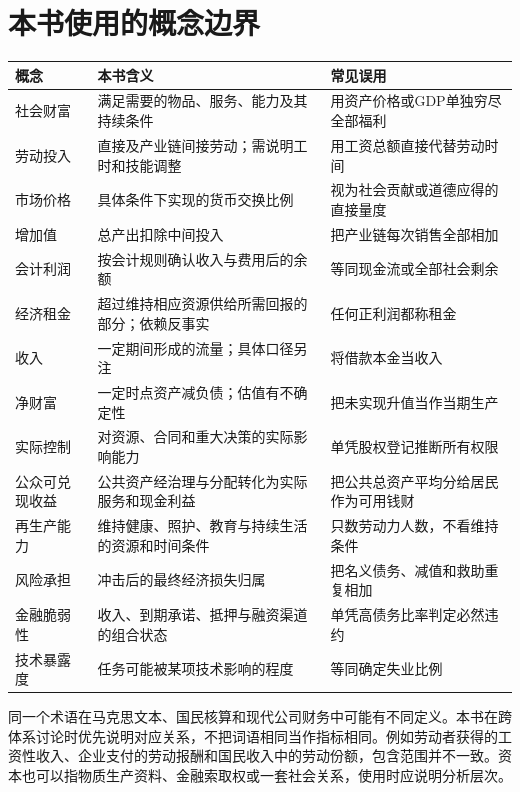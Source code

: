 \documentclass[UTF8,fontset=fandol,zihao=-4,oneside,openany]{ctexbook}
\begin{document}
\section{本书使用的概念边界}
\begin{longtable}{p{29mm}p{57mm}p{57mm}}
\toprule 概念 & 本书含义 & 常见误用\\\midrule\endhead
社会财富 & 满足需要的物品、服务、能力及其持续条件 & 用资产价格或GDP单独穷尽全部福利\\
劳动投入 & 直接及产业链间接劳动；需说明工时和技能调整 & 用工资总额直接代替劳动时间\\
市场价格 & 具体条件下实现的货币交换比例 & 视为社会贡献或道德应得的直接量度\\
增加值 & 总产出扣除中间投入 & 把产业链每次销售全部相加\\
会计利润 & 按会计规则确认收入与费用后的余额 & 等同现金流或全部社会剩余\\
经济租金 & 超过维持相应资源供给所需回报的部分；依赖反事实 & 任何正利润都称租金\\
收入 & 一定期间形成的流量；具体口径另注 & 将借款本金当收入\\
净财富 & 一定时点资产减负债；估值有不确定性 & 把未实现升值当作当期生产\\
实际控制 & 对资源、合同和重大决策的实际影响能力 & 单凭股权登记推断所有权限\\
公众可兑现收益 & 公共资产经治理与分配转化为实际服务和现金利益 & 把公共总资产平均分给居民作为可用钱财\\
再生产能力 & 维持健康、照护、教育与持续生活的资源和时间条件 & 只数劳动力人数，不看维持条件\\
风险承担 & 冲击后的最终经济损失归属 & 把名义债务、减值和救助重复相加\\
金融脆弱性 & 收入、到期承诺、抵押与融资渠道的组合状态 & 单凭高债务比率判定必然违约\\
技术暴露度 & 任务可能被某项技术影响的程度 & 等同确定失业比例\\
\bottomrule
\end{longtable}

同一个术语在马克思文本、国民核算和现代公司财务中可能有不同定义。本书在跨体系讨论时优先说明对应关系，不把词语相同当作指标相同。例如劳动者获得的工资性收入、企业支付的劳动报酬和国民收入中的劳动份额，包含范围并不一致。资本也可以指物质生产资料、金融索取权或一套社会关系，使用时应说明分析层次。
\end{document}
